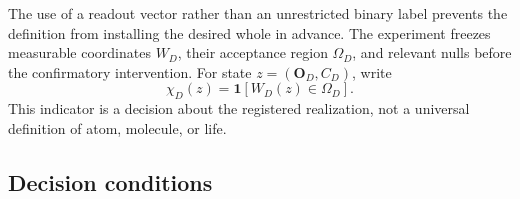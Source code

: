 \documentclass[11pt,a4paper]{article}
\begin{document}
The use of a readout vector rather than an unrestricted binary label prevents the definition from installing the desired whole in advance. The experiment freezes measurable coordinates $W_D$, their acceptance region $\Omega_D$, and relevant nulls before the confirmatory intervention. For state $z=(\mathbf O_D,C_D)$, write
\begin{equation}
 \chi_D(z)=\mathbf 1\!\left[W_D(z)\in\Omega_D\right].
 \label{eq:whole-criterion}
\end{equation}
This indicator is a decision about the registered realization, not a universal definition of atom, molecule, or life.

\subsection{Decision conditions}
\end{document}
